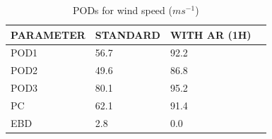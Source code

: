 \begin{table}[h!]
\begin{center}
\begin{tabular}{|l|l|l|l|}
\hline
\multicolumn{1}{|c|}{\cellcolor[HTML]{C0C0C0}\textbf{PARAMETER}} & \multicolumn{1}{c|}{\cellcolor[HTML]{C0C0C0}\textbf{STANDARD}} & \multicolumn{1}{c|}{\cellcolor[HTML]{C0C0C0}\textbf{WITH AR (1H)}} \\
\hline
\cellcolor[HTML]{C0C0C0}POD1  & 56.7                                & 92.2         \\
\cellcolor[HTML]{C0C0C0}POD2  & 49.6                                & 86.8         \\
\cellcolor[HTML]{C0C0C0}POD3  & 80.1                                & 95.2         \\
\cellcolor[HTML]{C0C0C0}PC    & 62.1                                  & 91.4           \\
\cellcolor[HTML]{C0C0C0}EBD   & 2.8                                 & 0.0          \\
\hline
\end{tabular}
\caption{PODs for wind speed ($m s^{-1}$)}
\end{center}
\end{table}
